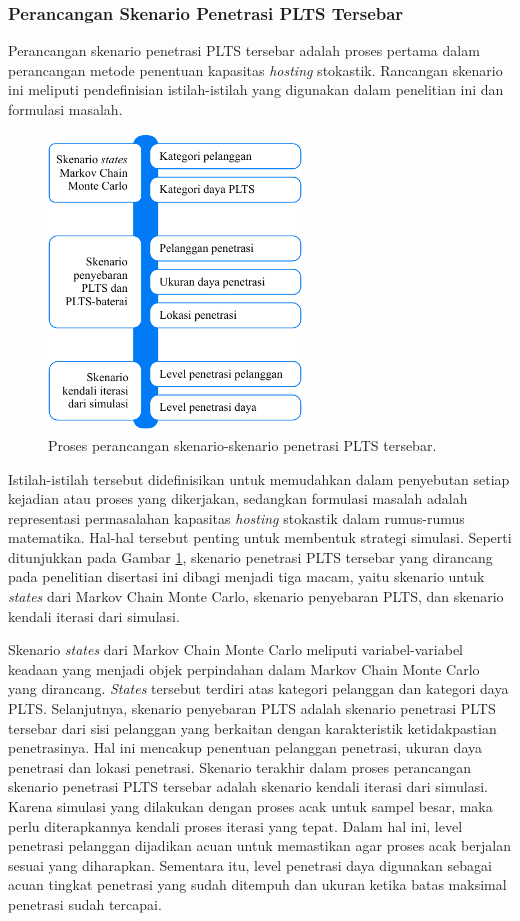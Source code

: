 \subsubsection{Perancangan Skenario Penetrasi PLTS Tersebar}
Perancangan skenario penetrasi PLTS tersebar adalah proses pertama dalam perancangan metode penentuan kapasitas \textit{\textit{hosting}} stokastik. Rancangan skenario ini meliputi pendefinisian istilah-istilah yang digunakan dalam penelitian ini dan formulasi masalah.
\begin{figure}[!h]
	\centering
	\includegraphics[width=0.6\textwidth]{Fig/stage2-1}
	\caption{Proses perancangan skenario-skenario penetrasi PLTS tersebar.}
	\label{stage2-1}
\end{figure}
Istilah-istilah tersebut didefinisikan untuk memudahkan dalam penyebutan setiap kejadian atau proses yang dikerjakan, sedangkan formulasi masalah adalah representasi permasalahan kapasitas \textit{\textit{hosting}} stokastik dalam rumus-rumus matematika. Hal-hal tersebut penting untuk membentuk strategi simulasi. Seperti ditunjukkan pada Gambar \ref{stage2-1}, skenario penetrasi PLTS tersebar yang dirancang pada penelitian disertasi ini dibagi menjadi tiga macam, yaitu skenario untuk \textit{states} dari Markov Chain Monte Carlo, skenario penyebaran PLTS, dan skenario kendali iterasi dari simulasi.

Skenario \textit{states} dari Markov Chain Monte Carlo meliputi variabel-variabel keadaan yang menjadi objek perpindahan dalam Markov Chain Monte Carlo yang dirancang. \textit{States} tersebut terdiri atas kategori pelanggan dan kategori daya PLTS. Selanjutnya, skenario penyebaran PLTS adalah skenario penetrasi PLTS tersebar dari sisi pelanggan yang berkaitan dengan karakteristik ketidakpastian penetrasinya. Hal ini mencakup penentuan pelanggan penetrasi, ukuran daya penetrasi dan lokasi penetrasi. Skenario terakhir dalam proses perancangan skenario penetrasi PLTS tersebar adalah skenario kendali iterasi dari simulasi. Karena simulasi yang dilakukan dengan proses acak untuk sampel besar, maka perlu diterapkannya kendali proses iterasi yang tepat. Dalam hal ini, level penetrasi pelanggan dijadikan acuan untuk memastikan agar proses acak berjalan sesuai yang diharapkan. Sementara itu, level penetrasi daya digunakan sebagai acuan tingkat penetrasi yang sudah ditempuh dan ukuran ketika batas maksimal penetrasi sudah tercapai.

